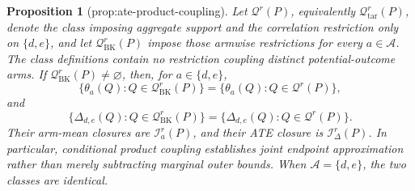 \documentclass{article}
\newtheorem{proposition}{Proposition}
\begin{document}
\begin{proposition}[prop:ate-product-coupling]\label{prop:ate-product-coupling}
Let \(\mathcal Q^r(P)\), equivalently \(\mathcal Q_{\mathrm{tar}}^r(P)\), denote the class imposing aggregate support and the correlation restriction only on \(\{d,e\}\), and let \(\mathcal Q_{\mathrm{BK}}^r(P)\) impose those armwise restrictions for every \(a\in\mathcal A\).  The class definitions contain no restriction coupling distinct potential-outcome arms.  If \(\mathcal Q_{\mathrm{BK}}^r(P)\ne\varnothing\), then, for \(a\in\{d,e\}\),
\[
 \{\theta_a(Q):Q\in\mathcal Q_{\mathrm{BK}}^r(P)\}
 =\{\theta_a(Q):Q\in\mathcal Q^r(P)\},
\]
and
\[
 \{\Delta_{d,e}(Q):Q\in\mathcal Q_{\mathrm{BK}}^r(P)\}
 =\{\Delta_{d,e}(Q):Q\in\mathcal Q^r(P)\}.
\]
Their arm-mean closures are \(\mathcal I_a^r(P)\), and their ATE closure is \(\mathcal I_\Delta^r(P)\).  In particular, conditional product coupling establishes joint endpoint approximation rather than merely subtracting marginal outer bounds.  When \(\mathcal A=\{d,e\}\), the two classes are identical.
\end{proposition}
\end{document}
